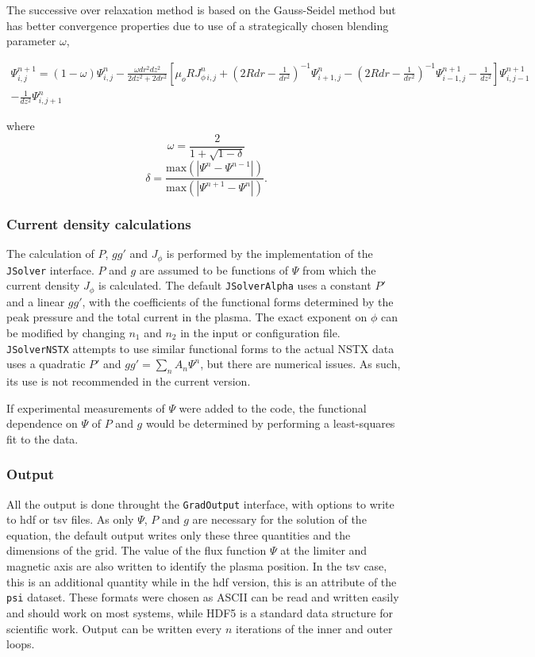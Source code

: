 \documentclass[paper=letter, fontsize=11pt]{scrartcl} %
\begin{document}
The successive over relaxation method is based on the Gauss-Seidel method but has better convergence properties due to use of a strategically chosen blending parameter $\omega$, 

\begin{multline} \label{eq:SOR}
\Psi^{n+1}_{i,j} = (1-\omega)\Psi^n_{i,j} -\frac{\omega dr^2 dz^2}{2dz^2 + 2dr^2} \left[ \mu_o R J^n_{\phi \, i, j} + \left(2 R dr - \frac{1}{dr^2}\right)^{-1} \Psi^{n}_{i+1,j} - \left(2 R dr - \frac{1}{dr^2}\right)^{-1} \Psi^{n+1}_{i-1,j} - \frac{1}{dz^2} \right] \Psi^{n+1}_{i,j-1} \\ - \frac{1}{dz^2}\Psi^n_{i, j+1}
\end{multline}

where
\begin{equation}
\omega = \frac{2}{1 + \sqrt{1 - \delta}}
\end{equation}
\begin{equation}
\delta = \frac{\text{max} (\left| \Psi^n - \Psi^{n-1} \right| )}{\text{max} (\left| \Psi^{n+1} - \Psi^{n} \right| )}.
\end{equation}

\subsubsection{Current density calculations}
The calculation of $P$, $gg'$ and $J_\phi$ is performed by the implementation of the \texttt{JSolver} interface. $P$ and $g$ are assumed to be functions of $\Psi$ from which the current density $J_\phi$ is calculated. The default \texttt{JSolverAlpha} uses a constant $P'$ and a linear $gg'$, with the coefficients of the functional forms determined by the peak pressure and the total current in the plasma. The exact exponent on $\phi$ can be modified by changing $n_1$ and $n_2$ in the input or configuration file. \texttt{JSolverNSTX} attempts to use similar functional forms to the actual NSTX data uses a quadratic $P'$ and $gg' = \sum_n A_n\Psi^n$, but there are numerical issues. As such, its use is not recommended in the current version. 

If experimental measurements of $\Psi$ were added to the code, the functional dependence on $\Psi$ of $P$ and $g$ would be determined by performing a least-squares fit to the data. 

\subsubsection{Output}
All the output is done throught the \texttt{GradOutput} interface, with options to write to hdf or tsv files. As only $\Psi$, $P$ and $g$ are necessary for the solution of the equation, the default output writes only these three quantities and the dimensions of the grid. The value of the flux function $\Psi$ at the limiter and magnetic axis are also written to identify the plasma position. In the tsv case, this is an additional quantity while in the hdf version, this is an attribute of the \texttt{psi} dataset. These formats were chosen as ASCII can be read and written easily and should work on most systems, while HDF5 is a standard data structure for scientific work. Output can be written every $n$ iterations of the inner and outer loops. 
\end{document}
